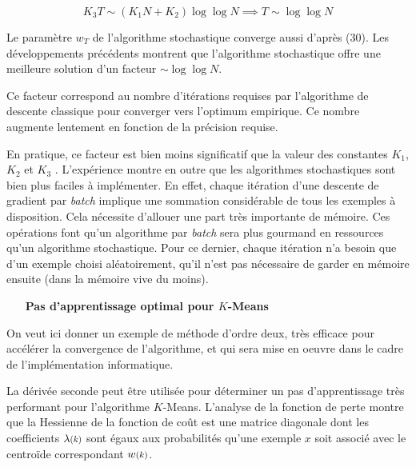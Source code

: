 \documentclass{article}
\begin{document}
\begin{equation*}
    K_3 T \sim (K_1 N + K_2) \log \log N \implies T \sim \log \log N
\end{equation*}

Le paramètre $w_T$ de l'algorithme stochastique converge aussi d'après (30). Les développements précédents montrent que l'algorithme stochastique offre une meilleure solution d'un facteur $\sim \log \log N$.

Ce facteur correspond au nombre d'itérations requises par l'algorithme de descente classique pour converger vers l'optimum empirique. Ce nombre augmente lentement en fonction de la précision requise. 
\bigskip

En pratique, ce facteur est bien moins significatif que la valeur des constantes $K_1$, $K_2$ et $K_3$ \cite{bottou-mlss-2004}. L'expérience montre en outre que les algorithmes stochastiques sont bien plus faciles à implémenter. En effet, chaque itération d'une descente de gradient par \emph{batch} implique une sommation considérable de tous les exemples à disposition. Cela nécessite d'allouer une part très importante de mémoire. Ces opérations font qu'un algorithme par \emph{batch} sera plus gourmand en ressources qu'un algorithme stochastique. Pour ce dernier, chaque itération n'a besoin que d'un exemple choisi aléatoirement, qu'il n'est pas nécessaire de garder en mémoire ensuite (dans la mémoire vive du moins). 
\bigskip

\begin{itemize}
  \item[\textbf{Pas d'apprentissage optimal pour $K$-Means}]
\end{itemize}
\bigskip

On veut ici donner un exemple de méthode d'ordre deux, très efficace pour accélérer la convergence de l'algorithme, et qui sera mise en oeuvre dans le cadre de l'implémentation informatique.
\bigskip

La dérivée seconde peut être utilisée pour déterminer un pas d'apprentissage très performant pour l'algorithme $K$-Means. L'analyse de la fonction de perte montre que la Hessienne de la fonction de coût est une matrice diagonale dont les coefficients $\lambda \scalebox{0.8}{$(k)$}$ sont égaux aux probabilités qu'une exemple $x$ soit associé avec le centroïde correspondant $w \scalebox{0.8}{$(k)$}$.
\end{document}
